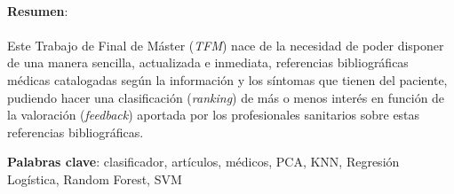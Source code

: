 \paragraph{}
\textbf{Resumen}:
\paragraph{}
Este Trabajo de Final de Máster (\textit{TFM}) nace de la necesidad de poder disponer de una manera sencilla, actualizada e inmediata, referencias bibliográficas médicas catalogadas según la información y los síntomas que tienen del paciente, pudiendo hacer una clasificación (\textit{ranking}) de más o menos interés en función de la valoración (\textit{feedback}) aportada por los profesionales sanitarios sobre estas referencias bibliográficas.

\vspace{1.5cm}

\textbf{Palabras clave}: clasificador, artículos, médicos, PCA, KNN, Regresión Logística, Random Forest, SVM